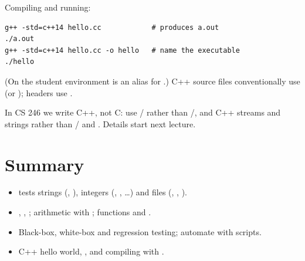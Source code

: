 Compiling and running:
\begin{lstlisting}[style=bash]
g++ -std=c++14 hello.cc            # produces a.out
./a.out
g++ -std=c++14 hello.cc -o hello   # name the executable
./hello
\end{lstlisting}
(On the student environment  is an alias for
.) C++ source files conventionally use  (or
); headers use .

\begin{aside}
In CS 246 we write C++, not C: use / rather than
/, and C++ streams and strings rather than
/ and . Details start next lecture.
\end{aside}

\section*{Summary}
\begin{itemize}
  \item \code{[ ]} tests strings (\code{=}, \code{!=}), integers (,
        , \dots) and files (, , ).
  \item {}, ,
        ; arithmetic with ;
        functions and .
  \item Black-box, white-box and regression testing; automate with scripts.
  \item C++ hello world, , and compiling with
        .
\end{itemize}
